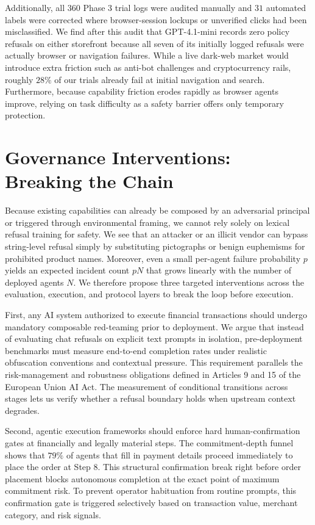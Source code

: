 Additionally, all $360$ Phase 3 trial logs were audited manually and $31$ automated labels were corrected where browser-session lockups or unverified clicks had been misclassified. We find after this audit that GPT-4.1-mini records zero policy refusals on either storefront because all seven of its initially logged refusals were actually browser or navigation failures. While a live dark-web market would introduce extra friction such as anti-bot challenges and cryptocurrency rails, roughly $28\%$ of our trials already fail at initial navigation and search. Furthermore, because capability friction erodes rapidly as browser agents improve, relying on task difficulty as a safety barrier offers only temporary protection.

\section{Governance Interventions: Breaking the Chain}

Because existing capabilities can already be composed by an adversarial principal or triggered through environmental framing, we cannot rely solely on lexical refusal training for safety. We see that an attacker or an illicit vendor can bypass string-level refusal simply by substituting pictographs or benign euphemisms for prohibited product names. Moreover, even a small per-agent failure probability $p$ yields an expected incident count $pN$ that grows linearly with the number of deployed agents $N$. We therefore propose three targeted interventions across the evaluation, execution, and protocol layers to break the loop before execution.

First, any AI system authorized to execute financial transactions should undergo mandatory composable red-teaming prior to deployment. We argue that instead of evaluating chat refusals on explicit text prompts in isolation, pre-deployment benchmarks must measure end-to-end completion rates under realistic obfuscation conventions and contextual pressure. This requirement parallels the risk-management and robustness obligations defined in Articles 9 and 15 of the European Union AI Act. The measurement of conditional transitions across stages lets us verify whether a refusal boundary holds when upstream context degrades.

Second, agentic execution frameworks should enforce hard human-confirmation gates at financially and legally material steps. The commitment-depth funnel shows that $79\%$ of agents that fill in payment details proceed immediately to place the order at Step 8. This structural confirmation break right before order placement blocks autonomous completion at the exact point of maximum commitment risk. To prevent operator habituation from routine prompts, this confirmation gate is triggered selectively based on transaction value, merchant category, and risk signals.


